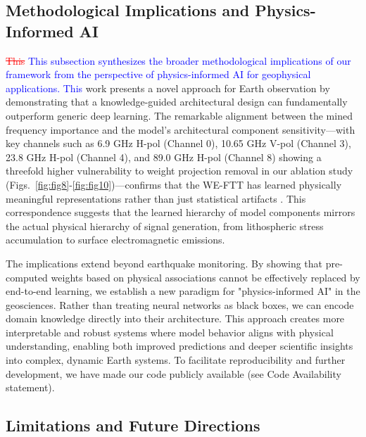 \documentclass[preprint,review,12pt,authoryear]{elsarticle}
\providecommand{\DIFaddtex}[1]{{\sf #1}} %
\providecommand{\DIFdeltex}[1]{{[..\footnote{removed: #1} ]}} %
\providecommand{\DIFaddbegin}{} %
\providecommand{\DIFaddend}{} %
\providecommand{\DIFdelbegin}{} %
\providecommand{\DIFdelend}{} %
\providecommand{\DIFadd}[1]{\texorpdfstring{\DIFaddtex{#1}}{#1}} %
\providecommand{\DIFdel}[1]{\texorpdfstring{\DIFdeltex{#1}}{}} %
\newcommand{\DIFscaledelfig}{0.5}
\newlength{\DIFdelgraphicswidth} %
\newlength{\DIFdelgraphicsheight} %
\newcommand{\DIFaddincludegraphics}[2][]{{\color{blue}\fbox{\DIFOincludegraphics[#1]{#2}}}} %
\newcommand{\DIFdelincludegraphics}[2][]{%
\sbox{\DIFdelgraphicsbox}{\DIFOincludegraphics[#1]{#2}}%
\settoboxwidth{\DIFdelgraphicswidth}{\DIFdelgraphicsbox} %
\settoboxtotalheight{\DIFdelgraphicsheight}{\DIFdelgraphicsbox} %
\scalebox{\DIFscaledelfig}{%
\parbox[b]{\DIFdelgraphicswidth}{\usebox{\DIFdelgraphicsbox}\\[-\baselineskip] \rule{\DIFdelgraphicswidth}{0em}}\llap{\resizebox{\DIFdelgraphicswidth}{\DIFdelgraphicsheight}{%
\setlength{\unitlength}{\DIFdelgraphicswidth}%
\begin{picture}(1,1)%
\thicklines\linethickness{2pt} %
{\color[rgb]{1,0,0}\put(0,0){\framebox(1,1){}}}%
{\color[rgb]{1,0,0}\put(0,0){\line( 1,1){1}}}%
{\color[rgb]{1,0,0}\put(0,1){\line(1,-1){1}}}%
\end{picture}%
}\hspace*{3pt}}} %
} %
\DeclareRobustCommand{\DIFaddbegin}{\DIFOaddbegin \let\includegraphics\DIFaddincludegraphics} %
\DeclareRobustCommand{\DIFaddend}{\DIFOaddend \let\includegraphics\DIFOincludegraphics} %
\DeclareRobustCommand{\DIFdelbegin}{\DIFOdelbegin \let\includegraphics\DIFdelincludegraphics} %
\DeclareRobustCommand{\DIFdelend}{\DIFOaddend \let\includegraphics\DIFOincludegraphics} %
\renewcommand{\DIFaddtex}[1]{\textcolor{blue}{#1}}
\renewcommand{\DIFdeltex}[1]{\textcolor{red}{\sout{#1}}}
\begin{document}
\subsection{Methodological Implications and Physics-Informed AI}\label{sec:discuss_implications}
\DIFdelbegin %

\DIFdel{This }\DIFdelend \DIFaddbegin \DIFadd{This subsection synthesizes the broader methodological implications of our framework from the perspective of physics-informed AI for geophysical applications. This }\DIFaddend work presents a novel approach for Earth observation by demonstrating that a knowledge-guided architectural design can fundamentally outperform generic deep learning. The remarkable alignment between the mined frequency importance and the model's architectural component sensitivity---with key channels such as 6.9 GHz H-pol (Channel 0), 10.65 GHz V-pol (Channel 3), 23.8 GHz H-pol (Channel 4), and 89.0 GHz H-pol (Channel 8) showing a threefold higher vulnerability to weight projection removal in our ablation study (Figs.~\ref{fig:fig8}-\ref{fig:fig10})---confirms that the WE-FTT has learned physically meaningful representations rather than just statistical artifacts \citep{maoAdditionalMicrowaveRadiation2020}. This correspondence suggests that the learned hierarchy of model components mirrors the actual physical hierarchy of signal generation, from lithospheric stress accumulation to surface electromagnetic emissions.

The implications extend beyond earthquake monitoring. By showing that pre-computed weights based on physical associations cannot be effectively replaced by end-to-end learning, we establish a new paradigm for "physics-informed AI" in the geosciences. Rather than treating neural networks as black boxes, we can encode domain knowledge directly into their architecture. This approach creates more interpretable and robust systems where model behavior aligns with physical understanding, enabling both improved predictions and deeper scientific insights into complex, dynamic Earth systems. To facilitate reproducibility and further development, we have made our code publicly available (see Code Availability statement).

\subsection{Limitations and Future Directions}\label{sec:discuss_limitations}
\DIFdelbegin %
\end{document}
